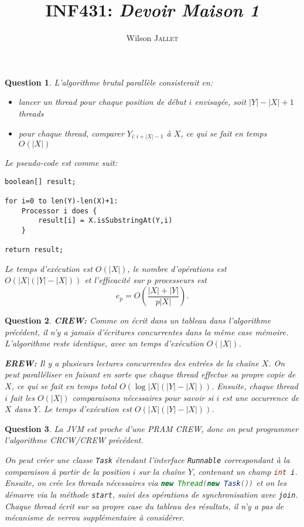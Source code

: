 \documentclass{article}
\title{INF431: \textit{Devoir Maison 1}}
\author{Wilson \textsc{Jallet}}
\theoremstyle{break}
\newtheorem{ques}{Question}
\begin{document}
\maketitle

\begin{ques}
L'algorithme brutal parallèle consisterait en:\begin{itemize}
\item lancer un \textit{thread} pour chaque position de début $i$ envisagée, soit $|Y|-|X|+1$ \textit{threads}
\item pour chaque thread, comparer $Y_{i:i+|X|-1}$ à $X$, ce qui se fait en temps $O(|X|)$
\end{itemize}

Le pseudo-code est comme suit:
\begin{lstlisting}
boolean[] result;

for i=0 to len(Y)-len(X)+1:
	Processor i does {
		result[i] = X.isSubstringAt(Y,i)
	}

return result;
\end{lstlisting}

Le temps d'exécution est $O(|X|)$, le nombre d'opérations est $O\left(|X|(|Y|-|X|)\right)$ et l'efficacité sur $p$ processeurs est
\[
e_p = O\left(\frac{|X|+|Y|}{p|X|}\right).
\]


\end{ques}

\begin{ques}
\textbf{CREW:} Comme on écrit dans un tableau dans l'algorithme précédent, il n'y a jamais d'écritures concurrentes dans la même case mémoire. L'algorithme reste identique, avec un temps d'exécution $O(|X|)$.

\noindent\textbf{EREW:} Il y a plusieurs lectures concurrentes des entrées de la chaîne $X$. On peut paralléliser en faisant en sorte que chaque \textit{thread} effectue sa propre copie de $X$, ce qui se fait en temps total $O\left(\log|X|(|Y|-|X|)\right)$. Ensuite, chaque \textit{thread} $i$ fait les $O(|X|)$ comparaisons nécessaires pour savoir si $i$ est une occurrence de $X$ dans $Y$. Le temps d'exécution est $O\left(|X|(|Y|-|X|)\right)$.

\end{ques}


\begin{ques}
La JVM est proche d'une PRAM CREW, donc on peut programmer l'algorithme CRCW/CREW précédent.

On peut créer une classe \lstinline|Task| étendant l'interface \lstinline|Runnable| correspondant à la comparaison à partir de la position $i$ sur la chaîne $Y$, contenant un champ \lstinline[language=Java]|int i|. Ensuite, on crée les \textit{threads} nécessaires via \lstinline[language=Java]|new Thread(new Task())| et on les démarre via la méthode \lstinline|start|, suivi des opérations de synchronisation avec \lstinline|join|. Chaque \textit{thread} écrit sur sa propre case du tableau des résultats, il n'y a pas de mécanisme de verrou supplémentaire à considérer.
\end{ques}
\end{document}
